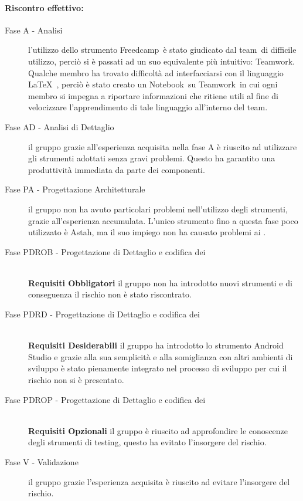 \documentclass[../PianoProgetto.tex]{subfiles}
\begin{document}
	\paragraph*{Riscontro effettivo:} 
		\begin{description}
			\item[Fase A - Analisi] l'utilizzo dello strumento Freedcamp\g\ è stato giudicato dal team\g\ di difficile utilizzo, perciò si è passati ad un suo equivalente più intuitivo: Teamwork\g .
	Qualche membro ha trovato difficoltà ad interfacciarsi con il linguaggio \LaTeX\  , perciò è stato creato un Notebook\g\ su Teamwork\g\ in cui ogni membro si impegna a riportare informazioni che ritiene utili al fine di velocizzare l'apprendimento di tale linguaggio all'interno del team\g .
			\item[Fase AD - Analisi di Dettaglio] il gruppo grazie all'esperienza acquisita nella fase A è riuscito ad utilizzare gli strumenti adottati senza gravi problemi. Questo ha garantito una produttività immediata da parte dei componenti. 
			\item[Fase PA - Progettazione Architetturale] il gruppo non ha avuto particolari problemi nell'utilizzo degli strumenti, grazie all'esperienza accumulata. L'unico strumento fino a questa fase poco utilizzato è Astah\g, ma il suo impiego non ha causato problemi ai \progettisti.
			\item[Fase PDROB - Progettazione di Dettaglio e codifica dei] \ \\
			\textbf{Requisiti Obbligatori} il gruppo non ha introdotto nuovi strumenti e di conseguenza il rischio non è stato riscontrato. 
					 
			\item[Fase PDRD - Progettazione di Dettaglio e codifica dei] \ \\
					\textbf{Requisiti Desiderabili} il gruppo ha introdotto lo strumento Android Studio e grazie alla sua semplicità e alla somiglianza con altri ambienti di sviluppo è stato pienamente integrato nel processo di sviluppo per cui il rischio non si è presentato.
			\item[Fase PDROP - Progettazione di Dettaglio e codifica dei]  \ \\
					\textbf{Requisiti Opzionali} il gruppo è riuscito ad approfondire le conoscenze degli strumenti di testing, questo ha evitato l'insorgere del rischio.
			\item[Fase V - Validazione] il gruppo grazie l'esperienza acquisita è riuscito ad evitare l'insorgere del rischio.
		\end{description}
		
\end{document}
